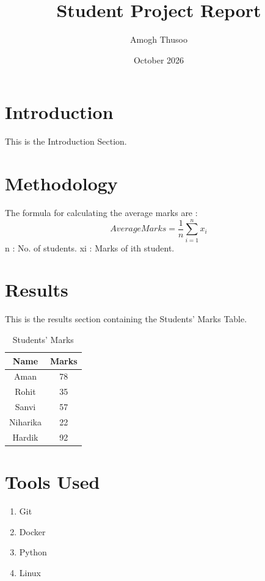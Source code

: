 \documentclass{article}
\title{Student Project Report}
\author{Amogh Thusoo}
\date{October 2026}
\begin{document}
\maketitle

\section{Introduction}
This is the Introduction Section.
\section{Methodology}

The formula for calculating the average marks are : 
\begin{equation}
    Average Marks = \frac{1}{n} \sum_{i = 1}^{n}x_i
\end{equation}
n : No. of students.
xi : Marks of ith student.

\section{Results}
This is the results section containing the Students' Marks Table.
\begin{table}[H]
    \centering
    \begin{tabular}{|c|c|}
        \hline
         Name & Marks \\
         \hline
         Aman & 78 \\
         Rohit & 35 \\
         Sanvi & 57 \\
         Niharika & 22 \\
         Hardik & 92 \\
         \hline
    \end{tabular}
    \caption{Students' Marks}
    \label{student_marks}
\end{table}

\section{Tools Used}
\begin{enumerate}
    \item Git
    \item Docker
    \item Python
    \item Linux
\end{enumerate}
\end{document}
